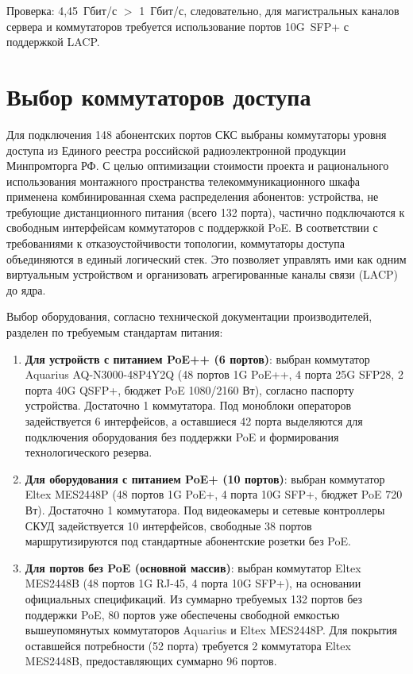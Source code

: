 \documentclass{bmstu}
\begin{document}
Проверка: 4,45~Гбит/с $>$ 1~Гбит/с, следовательно, для магистральных каналов сервера и коммутаторов требуется использование портов 10G~SFP+ с поддержкой LACP.





\section{Выбор коммутаторов доступа}

Для подключения 148 абонентских портов СКС выбраны коммутаторы уровня доступа из Единого реестра российской радиоэлектронной продукции Минпромторга РФ. С целью оптимизации стоимости проекта и рационального использования монтажного пространства телекоммуникационного шкафа применена комбинированная схема распределения абонентов: устройства, не требующие дистанционного питания (всего 132 порта), частично подключаются к свободным интерфейсам коммутаторов с поддержкой PoE. В соответствии с требованиями к отказоустойчивости топологии, коммутаторы доступа объединяются в единый логический стек. Это позволяет управлять ими как одним виртуальным устройством и организовать агрегированные каналы связи (LACP) до ядра. 

Выбор оборудования, согласно технической документации производителей, разделен по требуемым стандартам питания:

\begin{enumerate}
    \item \textbf{Для устройств с питанием PoE++ (6 портов)}: выбран коммутатор Aquarius AQ-N3000-48P4Y2Q (48 портов 1G PoE++, 4 порта 25G SFP28, 2 порта 40G QSFP+, бюджет PoE 1080/2160 Вт), согласно паспорту устройства. Достаточно 1 коммутатора. Под моноблоки операторов задействуется 6 интерфейсов, а оставшиеся 42 порта выделяются для подключения оборудования без поддержки PoE и формирования технологического резерва.
    \item \textbf{Для оборудования с питанием PoE+ (10 портов)}: выбран коммутатор Eltex MES2448P (48 портов 1G PoE+, 4 порта 10G SFP+, бюджет PoE 720 Вт). Достаточно 1 коммутатора. Под видеокамеры и сетевые контроллеры СКУД задействуется 10 интерфейсов, свободные 38 портов маршрутизируются под стандартные абонентские розетки без PoE.
    \item \textbf{Для портов без PoE (основной массив)}: выбран коммутатор Eltex MES2448B (48 портов 1G RJ-45, 4 порта 10G SFP+), на основании официальных спецификаций. Из суммарно требуемых 132 портов без поддержки PoE, 80 портов уже обеспечены свободной емкостью вышеупомянутых коммутаторов Aquarius и Eltex MES2448P. Для покрытия оставшейся потребности (52 порта) требуется 2 коммутатора Eltex MES2448B, предоставляющих суммарно 96 портов.
\end{enumerate}
\end{document}

